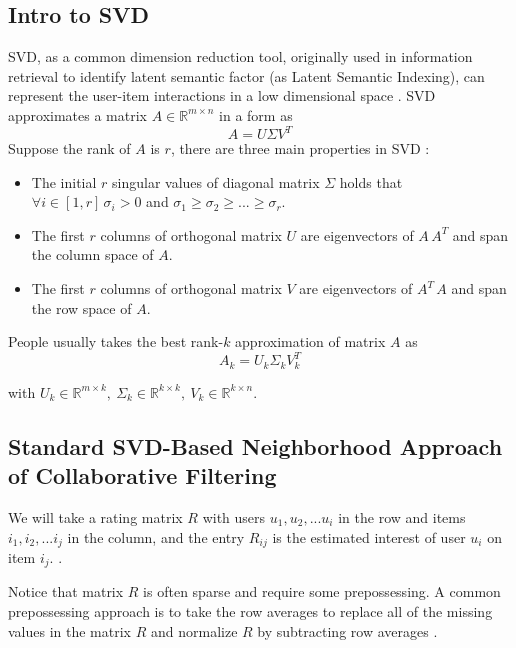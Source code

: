 \documentclass[letter paper, 11pt]{article}
\begin{document}
	\subsection{Intro to SVD}
		SVD, as a common dimension reduction tool, originally used in information retrieval to identify latent semantic factor (as Latent Semantic Indexing), can represent the user-item interactions in a low dimensional space \cite{MFinRS} \cite{ApplySVD}. SVD approximates a matrix $A \in \mathbb{R}^{m \times n}$ in a form as 
	\begin{equation}
		A = U \Sigma V^T
	\end{equation}
	Suppose the rank of $A$ is $r$, there are three main properties in SVD\cite{ApplySVD} \cite{gower}:
	\begin{itemize}
		\item 
		The initial $r$ singular values of diagonal matrix $\Sigma$ holds that $\forall i \in [1, r]\,\sigma_i > 0$ and $\sigma_1 \geq \sigma_2 \geq ... \geq \sigma_r$.
		
		\item 
		The first $r$ columns of orthogonal matrix $U$ are eigenvectors of $A\,A^T$ and span the column space of $A$.
		
		\item
		The first $r$ columns of orthogonal matrix $V$ are eigenvectors of $A^T\,A$ and span the row space of $A$.
	\end{itemize}
	
	People usually takes the best rank-$k$ approximation of matrix $A$ as 
	\begin{equation} \label{trun-SVD}
		A_k = U_k \Sigma_k V_k^T
	\end{equation}
	
	with $U_k \in \mathbb{R}^{m \times k}, \ \Sigma_k \in \mathbb{R}^{k \times k}, \ V_k \in \mathbb{R}^{k \times n}$.
	
	\subsection{Standard SVD-Based Neighborhood Approach of Collaborative Filtering}	
	We will take a rating matrix $R$ with users $u_1, u_2, ... u_i$ in the row and items $i_1, i_2, ... i_j$ in the column, and the entry $R_{ij}$ is the estimated interest of user $u_i$ on item $i_j$. \cite{MFinRS} \cite{CF-IterPCA} \cite{ApplySVD}.
	
	Notice that matrix $R$ is often sparse and require some prepossessing. A common prepossessing approach is to take the row averages to replace all of the missing values in the matrix $R$ and normalize $R$ by subtracting row averages \cite{ApplySVD} \cite{CF-IterPCA}.
	
\end{document}
